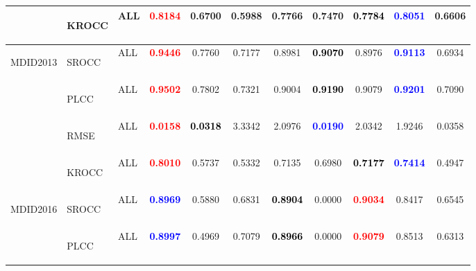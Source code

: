 \documentclass{article}
\begin{document}
\begin{table}
\begin{tabular}{||l|l|l||cccccccc||}
\cmidrule{2-11}\cmidrule{2-11}
&\multirow{1}{*}{\begin{turn}{-90}KROCC\end{turn}}&ALL&\textbf{\textcolor{red}{0.8184}}&0.6700&0.5988&0.7766&0.7470&\textbf{\textcolor{black}{0.7784}}&\textbf{\textcolor{blue}{0.8051}}&0.6606\\
\midrule\midrule
\multirow{4}{*}{\begin{turn}{-90}MDID2013\end{turn}}&\multirow{1}{*}{\begin{turn}{-90}SROCC\end{turn}}&ALL&\textbf{\textcolor{red}{0.9446}}&0.7760&0.7177&0.8981&\textbf{\textcolor{black}{0.9070}}&0.8976&\textbf{\textcolor{blue}{0.9113}}&0.6934\\
\cmidrule{2-11}\cmidrule{2-11}
&\multirow{1}{*}{\begin{turn}{-90}PLCC\end{turn}}&ALL&\textbf{\textcolor{red}{0.9502}}&0.7802&0.7321&0.9004&\textbf{\textcolor{black}{0.9190}}&0.9079&\textbf{\textcolor{blue}{0.9201}}&0.7090\\
\cmidrule{2-11}\cmidrule{2-11}
&\multirow{1}{*}{\begin{turn}{-90}RMSE\end{turn}}&ALL&\textbf{\textcolor{red}{0.0158}}&\textbf{\textcolor{black}{0.0318}}&3.3342&2.0976&\textbf{\textcolor{blue}{0.0190}}&2.0342&1.9246&0.0358\\
\cmidrule{2-11}\cmidrule{2-11}
&\multirow{1}{*}{\begin{turn}{-90}KROCC\end{turn}}&ALL&\textbf{\textcolor{red}{0.8010}}&0.5737&0.5332&0.7135&0.6980&\textbf{\textcolor{black}{0.7177}}&\textbf{\textcolor{blue}{0.7414}}&0.4947\\
\midrule\midrule
\multirow{4}{*}{\begin{turn}{-90}MDID2016\end{turn}}&\multirow{1}{*}{\begin{turn}{-90}SROCC\end{turn}}&ALL&\textbf{\textcolor{blue}{0.8969}}&0.5880&0.6831&\textbf{\textcolor{black}{0.8904}}&0.0000&\textbf{\textcolor{red}{0.9034}}&0.8417&0.6545\\
\cmidrule{2-11}\cmidrule{2-11}
&\multirow{1}{*}{\begin{turn}{-90}PLCC\end{turn}}&ALL&\textbf{\textcolor{blue}{0.8997}}&0.4969&0.7079&\textbf{\textcolor{black}{0.8966}}&0.0000&\textbf{\textcolor{red}{0.9079}}&0.8513&0.6313\\

\end{tabular}
\end{table}
\end{document}
